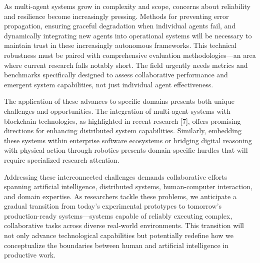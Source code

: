 \documentclass[journal,twoside,10pt]{IEEEtran}
\begin{document}
As multi-agent systems grow in complexity and scope, concerns about reliability and resilience become increasingly pressing. Methods for preventing error propagation, ensuring graceful degradation when individual agents fail, and dynamically integrating new agents into operational systems will be necessary to maintain trust in these increasingly autonomous frameworks. This technical robustness must be paired with comprehensive evaluation methodologies—an area where current research falls notably short. The field urgently needs metrics and benchmarks specifically designed to assess collaborative performance and emergent system capabilities, not just individual agent effectiveness.

The application of these advances to specific domains presents both unique challenges and opportunities. The integration of multi-agent systems with blockchain technologies, as highlighted in recent research [7], offers promising directions for enhancing distributed system capabilities. Similarly, embedding these systems within enterprise software ecosystems or bridging digital reasoning with physical action through robotics presents domain-specific hurdles that will require specialized research attention.

Addressing these interconnected challenges demands collaborative efforts spanning artificial intelligence, distributed systems, human-computer interaction, and domain expertise. As researchers tackle these problems, we anticipate a gradual transition from today's experimental prototypes to tomorrow's production-ready systems—systems capable of reliably executing complex, collaborative tasks across diverse real-world environments. This transition will not only advance technological capabilities but potentially redefine how we conceptualize the boundaries between human and artificial intelligence in productive work.
\end{document}
